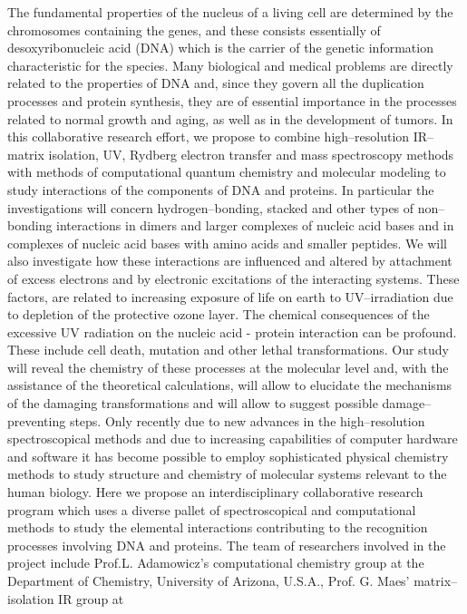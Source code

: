 \noindent
The fundamental properties of the nucleus of a living cell are
determined by the chromosomes containing the genes, and these consists
essentially of desoxyribonucleic acid (DNA) which  is the carrier
of the genetic information characteristic for the species. Many
biological and medical problems are directly related to the properties of
DNA and, since they govern all the duplication processes and protein
synthesis, they are of essential importance in the processes related to
normal growth and aging, as well as in the development of tumors.
In this collaborative research effort, we propose to combine 
high--resolution IR--matrix isolation, UV,
Rydberg electron transfer and mass spectroscopy
methods
with methods of
computational quantum chemistry and molecular modeling
to study interactions of the
components of DNA and proteins. In particular the investigations will
concern hydrogen--bonding, stacked and other types of non--bonding
interactions
in dimers and larger complexes of nucleic acid
bases and in complexes of nucleic acid bases with 
amino acids and smaller peptides. We will also investigate
how these interactions are influenced and altered by attachment of excess
electrons
and by electronic excitations of the interacting systems.
These factors, are related to increasing exposure of life on earth to
UV--irradiation due to depletion of the protective ozone layer. The
chemical consequences of the excessive UV radiation on the nucleic acid -
protein interaction can be profound. These include cell death,
mutation and other lethal transformations. Our study will reveal the
chemistry of these processes at the molecular level and, with the
assistance of the theoretical calculations, will allow to elucidate the
mechanisms of the damaging transformations and 
will allow to suggest possible
damage--preventing steps.
Only recently due to new advances in the high--resolution spectroscopical
methods and due to increasing capabilities of computer hardware and
software it has become possible to employ sophisticated physical
chemistry methods to study structure and chemistry of molecular systems
relevant to the human biology. Here we propose an
interdisciplinary collaborative 
research program which uses a diverse pallet of 
spectroscopical and computational methods 
to study the elemental interactions contributing
to the recognition processes involving DNA and proteins.
The team of researchers involved in the project include 
Prof.L. Adamowicz's computational chemistry group at the Department 
of Chemistry, University of
Arizona, U.S.A., Prof. G. Maes' matrix--isolation IR group at
